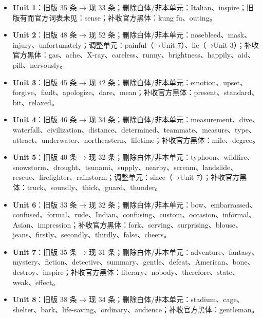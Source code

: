 \documentclass[UTF8,a4paper,11pt,oneside]{ctexbook}
\begin{document}
\par\addvspace{0.75em}\par
\vspace{0.12em}\noindent{\color{rulelight}\rule{\linewidth}{0.55pt}}\par
\addvspace{0.2em}
\begin{itemize}[leftmargin=2.2em,itemsep=0.25ex,topsep=0.3ex,label={\textcolor{mainblue}{\small\textbullet}}]
\item \textbf{\textcolor{mainblue}{Unit 1}}：旧版 35 条 → 现 33 条；删除白体/非本单元：Italian、inspire；旧版有而官方词表未见：sense；补收官方黑体：kung fu、outing。
\item \textbf{\textcolor{mainblue}{Unit 2}}：旧版 48 条 → 现 52 条；删除白体/非本单元：nosebleed、mask、injury、unfortunately；调整单元：painful（→Unit 7）、lie（→Unit 3）；补收官方黑体：gas、ache、X-ray、careless、runny、brightness、happily、aid、pill、nervously。
\item \textbf{\textcolor{mainblue}{Unit 3}}：旧版 45 条 → 现 42 条；删除白体/非本单元：emotion、upset、forgive、fault、apologize、dare、mean；补收官方黑体：present、standard、bit、relaxed。
\item \textbf{\textcolor{mainblue}{Unit 4}}：旧版 46 条 → 现 34 条；删除白体/非本单元：measurement、dive、waterfall、civilization、distance、determined、teammate、measure、type、attract、underwater、northeastern、lifetime；补收官方黑体：mile、degree。
\item \textbf{\textcolor{mainblue}{Unit 5}}：旧版 40 条 → 现 32 条；删除白体/非本单元：typhoon、wildfire、snowstorm、drought、tsunami、supply、nearby、scream、landslide、rescue、firefighter、rainstorm；调整单元：since（→Unit 7）；补收官方黑体：truck、soundly、thick、guard、thunder。
\item \textbf{\textcolor{mainblue}{Unit 6}}：旧版 33 条 → 现 32 条；删除白体/非本单元：bow、embarrassed、confused、formal、rude、Indian、confusing、custom、occasion、informal、Asian、impression；补收官方黑体：fork、serving、surprising、blouse、jeans、firstly、secondly、thirdly、false、cheers。
\item \textbf{\textcolor{mainblue}{Unit 7}}：旧版 35 条 → 现 31 条；删除白体/非本单元：adventure、fantasy、mystery、fiction、detective、summary、gentle、defeat、American、bone、destroy、inspire；补收官方黑体：literary、nobody、therefore、state、weak、effect。
\item \textbf{\textcolor{mainblue}{Unit 8}}：旧版 38 条 → 现 34 条；删除白体/非本单元：stadium、cage、shelter、bark、life-saving、ordinary、audience；补收官方黑体：gentleman。
\end{itemize}
\end{document}
